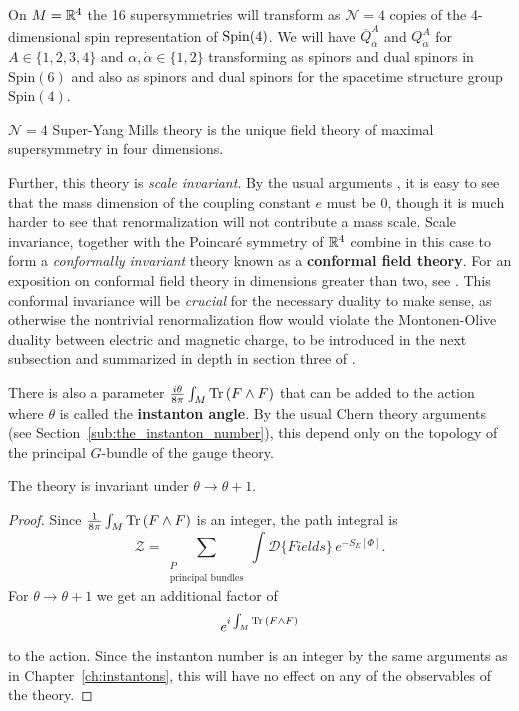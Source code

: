 On $M=\mathbb{R}^4$ the 16 supersymmetries will transform as $\mathcal N=4$ copies of the 4-dimensional spin representation of $\mathrm{Spin}(4)$. We will have $\overline Q^A_{\alpha}$ and $Q^A_{\dot \alpha}$ for $A \in \{1,2,3,4\}$ and $\alpha, \dot \alpha \in \{1,2\}$ transforming as spinors and dual spinors in $\mathrm{Spin}(6)$ and also as spinors and dual spinors for the spacetime structure group $\mathrm{Spin}(4)$.


\begin{phys}
	$\mathcal N=4$ Super-Yang Mills theory is the unique field theory of maximal supersymmetry in four dimensions.
\end{phys}

Further, this theory is \emph{scale invariant}. By the usual arguments \cite{schwartz2014}, it is easy to see that the mass dimension of the coupling constant $e$ must be 0, though it is much harder to see that renormalization will not contribute a mass scale. Scale invariance, together with the Poincar\'e symmetry of $\mathbb{R}^4$ combine in this case to form a \emph{conformally invariant} theory known as a \textbf{conformal field theory}. For an exposition on conformal field theory in dimensions greater than two, see \cite{simmons2016}. This conformal invariance will be \emph{crucial} for the necessary duality to make sense, as otherwise the nontrivial renormalization flow would violate the Montonen-Olive duality between electric and magnetic charge, to be introduced in the next subsection and summarized in depth in section three of \cite{kapustin2008}.


There is also a parameter $\frac{i \theta}{8\pi} \int_M \mathrm{Tr}\, (F \wedge F)$ that can be added to the action where $\theta$ is called the \textbf{instanton angle}. By the usual Chern theory arguments (see Section~\ref{sub:the_instanton_number}), this depend only on the topology of the principal $G$-bundle of the gauge theory.
\begin{obs}
	The theory is invariant under $\theta \to \theta + 1$.
\end{obs}
\begin{proof}
	Since $\frac{1}{8\pi} \int_M \mathrm{Tr}\, (F \wedge F)$ is an integer, the path integral is
	\[
		\mathcal Z = \sum_{\substack{P \\ \text{principal bundles}}} \int \mathcal D\{ Fields \} \, e^{- S_E[\Phi]}.
	\]
	For $\theta \to \theta+1$ we get an additional factor of 
	\[
		e^{i \int_M \mathrm{Tr}\,(F \wedge F)}
	\] 
	to the action. Since the instanton number is an integer by the same arguments as in Chapter~\ref{ch:instantons}, this will have no effect on any of the observables of the theory.
\end{proof}


